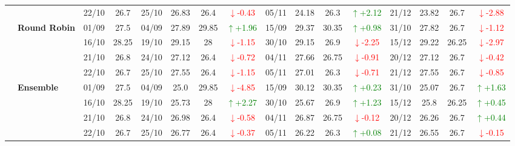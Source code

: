 {\begin{longtable}{llcc|cccc|cccc|cccc}
&
& 22/10 & 26.7 & 25/10 & 26.83 & 26.4 & \textcolor{red}{\(\downarrow\)-0.43} & 05/11 & 24.18 & 26.3 & \textcolor{green}{\(\uparrow\)+2.12} & 21/12 & 23.82 & 26.7 & \textcolor{red}{\(\downarrow\)-2.88} \\
\cmidrule(lr){2-16}


& \textbf{Round Robin}
& 01/09 & 27.5 & 04/09 & 27.89 & 29.85 & \textcolor{green}{\(\uparrow\)+1.96} & 15/09 & 29.37 & 30.35 & \textcolor{green}{\(\uparrow\)+0.98} & 31/10 & 27.82 & 26.7 & \textcolor{red}{\(\downarrow\)-1.12} \\

& 
& 16/10 & 28.25 & 19/10 & 29.15 & 28 & \textcolor{red}{\(\downarrow\)-1.15} & 30/10 & 29.15 & 26.9 & \textcolor{red}{\(\downarrow\)-2.25} & 15/12 & 29.22 & 26.25 & \textcolor{red}{\(\downarrow\)-2.97} \\

& 
& 21/10 & 26.8 & 24/10 & 27.12 & 26.4 & \textcolor{red}{\(\downarrow\)-0.72} & 04/11 & 27.66 & 26.75 & \textcolor{red}{\(\downarrow\)-0.91} & 20/12 & 27.12 & 26.7 & \textcolor{red}{\(\downarrow\)-0.42} \\

&
& 22/10 & 26.7 & 25/10 & 27.55 & 26.4 & \textcolor{red}{\(\downarrow\)-1.15} & 05/11 & 27.01 & 26.3 & \textcolor{red}{\(\downarrow\)-0.71} & 21/12 & 27.55 & 26.7 & \textcolor{red}{\(\downarrow\)-0.85} \\
\cmidrule(lr){2-16}


& \textbf{Ensemble}
& 01/09 & 27.5 & 04/09 & 25.0 & 29.85& \textcolor{red}{\(\downarrow\)-4.85} & 15/09 & 30.12 & 30.35 & \textcolor{green}{\(\uparrow\)+0.23} & 31/10 & 25.07 & 26.7 & \textcolor{green}{\(\uparrow\)+1.63} \\

& 
& 16/10 & 28.25 & 19/10 & 25.73 & 28 & \textcolor{green}{\(\uparrow\)+2.27} & 30/10 & 25.67 & 26.9 & \textcolor{green}{\(\uparrow\)+1.23} & 15/12 & 25.8 & 26.25 & \textcolor{green}{\(\uparrow\)+0.45} \\

& 
& 21/10 & 26.8 & 24/10 & 26.98 & 26.4 & \textcolor{red}{\(\downarrow\)-0.58} & 04/11 & 26.87 & 26.75 & \textcolor{red}{\(\downarrow\)-0.12} & 20/12 & 26.26 & 26.7 & \textcolor{green}{\(\uparrow\)+0.44} \\

&
& 22/10 & 26.7 & 25/10 & 26.77 & 26.4 & \textcolor{red}{\(\downarrow\)-0.37} & 05/11 & 26.22 & 26.3 & \textcolor{green}{\(\uparrow\)+0.08} & 21/12 & 26.55 & 26.7 & \textcolor{red}{\(\downarrow\)-0.15} \\
\midrule




\end{longtable}}
